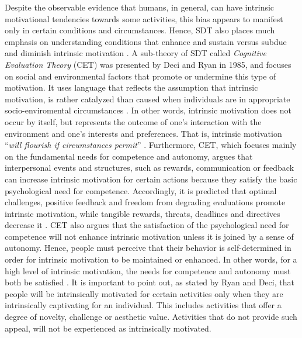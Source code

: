 Despite the observable evidence that humans, in general, can have intrinsic motivational tendencies towards some activities, this bias appears to manifest only in certain conditions and circumstances. Hence, SDT also places much emphasis on understanding conditions that enhance and sustain versus subdue and diminish intrinsic motivation \cite{ryan2000intrinsic}. A sub-theory of SDT called \textit{Cognitive Evaluation Theory} (CET) was presented by Deci and Ryan in 1985, and focuses on social and environmental factors that promote or undermine this type of motivation. It uses language that reflects the assumption that intrinsic motivation, is rather catalyzed than caused when individuals are in appropriate socio-enviromental circumstances \cite{ryan2000self, ryan2000intrinsic}. In other words, intrinsic motivation does not occur by itself, but represents the outcome of one's interaction with the environment and one's interests and preferences. That is, intrinsic motivation ``\textit{will flourish if circumstances permit}'' \cite{ryan2000self}. Furthermore, CET, which focuses mainly on the fundamental needs for competence and autonomy, argues that interpersonal events and structures, such as rewards, communication or feedback can increase intrinsic motivation for certain actions because they satisfy the basic psychological need for competence. Accordingly, it is predicted that optimal challenges, positive feedback and freedom from degrading evaluations promote intrinsic motivation, while tangible rewards, threats, deadlines  and  directives decrease it \cite{ryan2000self}. CET also argues that the satisfaction of the psychological need for competence will not enhance intrinsic motivation unless it is joined by a sense of autonomy. Hence, people must perceive that their behavior is self-determined in order for intrinsic motivation to be maintained or enhanced. In other words, for a high level of intrinsic motivation, the needs for competence and autonomy must both be satisfied \cite{ryan2000self}. It is important to point out, as stated by Ryan and Deci, that people will be intrinsically motivated for certain activities only when they are intrinsically captivating for an individual. This includes activities that offer a degree of novelty, challenge or aesthetic value. Activities that do not provide such appeal, will not be experienced as intrinsically motivated. \\\\
